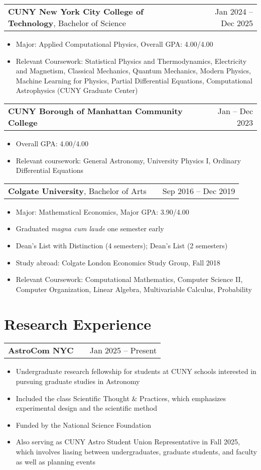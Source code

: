 \documentclass[a4paper,12pt]{article}
\makeatletter
\newenvironment{joblong}[2]
    {
    \begin{tabularx}{\linewidth}{@{}l X r@{}}
    #1 & \hfill &  #2 \\[3.75pt]
    \end{tabularx}
    \begin{minipage}[t]{\linewidth}
    \begin{itemize}[nosep,after=\strut, leftmargin=1em, itemsep=3pt,label=--]
    }
    {
    \end{itemize}
    \end{minipage}    
    }
\makeatother
\begin{document}
\begin{joblong}{\textbf{CUNY New York City College of Technology}, Bachelor of Science}{Jan 2024 -- Dec 2025}
\item Major: Applied Computational Physics, Overall GPA: 4.00/4.00
\item Relevant Coursework: Statistical Physics and Thermodynamics, Electricity and Magnetism, Classical Mechanics, Quantum Mechanics, Modern Physics, Machine Learning for Physics, Partial Differential Equations, Computational Astrophysics (CUNY Graduate Center)
\end{joblong}

\begin{joblong}{\textbf{CUNY Borough of Manhattan Community College}}{Jan -- Dec 2023}
\item Overall GPA: 4.00/4.00
\item Relevant coursework: General Astronomy, University Physics I, Ordinary Differential Equations
\end{joblong}

\begin{joblong}{\textbf{Colgate University}, Bachelor of Arts}{Sep 2016 -- Dec 2019}
\item Major: Mathematical Economics, Major GPA: 3.90/4.00
\item Graduated \textit{magna cum laude} one semester early
\item Dean's List with Distinction (4 semesters); Dean's List (2 semesters)
\item Study abroad: Colgate London Economics Study Group, Fall 2018
\item Relevant Coursework: Computational Mathematics, Computer Science II, Computer Organization, Linear Algebra, Multivariable Calculus, Probability
\end{joblong}


\section{Research Experience}

\begin{joblong}{\textbf{AstroCom NYC}}{Jan 2025 -- Present}
\item Undergraduate research fellowship for students at CUNY schools interested in pursuing graduate studies in Astronomy
\item Included the class Scientific Thought \& Practices, which emphasizes experimental design and the scientific method
\item Funded by the National Science Foundation
\item Also serving as CUNY Astro Student Union Representative in Fall 2025, which involves liasing between undergraduates, graduate students, and faculty as well as planning events
\end{joblong}
\end{document}
